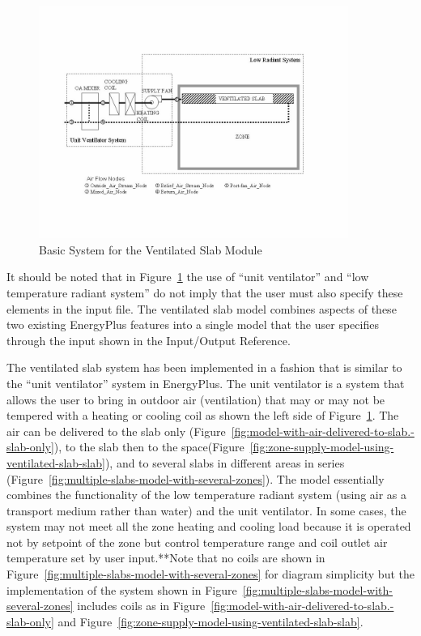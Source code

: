 \begin{figure}[hbtp] %
\centering
\includegraphics[width=0.9\textwidth, height=0.9\textheight, keepaspectratio=true]{media/image7396.png}
\caption{Basic System for the Ventilated Slab Module \protect \label{fig:basic-system-for-the-ventilated-slab-module}}
\end{figure}

It should be noted that in Figure~\ref{fig:basic-system-for-the-ventilated-slab-module} the use of ``unit ventilator'' and ``low temperature radiant system'' do not imply that the user must also specify these elements in the input file. The ventilated slab model combines aspects of these two existing EnergyPlus features into a single model that the user specifies through the input shown in the Input/Output Reference.

The ventilated slab system has been implemented in a fashion that is similar to the ``unit ventilator'' system in EnergyPlus. The unit ventilator is a system that allows the user to bring in outdoor air (ventilation) that may or may not be tempered with a heating or cooling coil as shown the left side of Figure~\ref{fig:basic-system-for-the-ventilated-slab-module}. The air can be delivered to the slab only (Figure~\ref{fig:model-with-air-delivered-to-slab.-slab-only}), to the slab then to the space(Figure~\ref{fig:zone-supply-model-using-ventilated-slab-slab}), and to several slabs in different areas in series (Figure~\ref{fig:multiple-slabs-model-with-several-zones}). The model essentially combines the functionality of the low temperature radiant system (using air as a transport medium rather than water) and the unit ventilator. In some cases, the system may not meet all the zone heating and cooling load because it is operated not by setpoint of the zone but control temperature range and coil outlet air temperature set by user input.**Note that no coils are shown in Figure~\ref{fig:multiple-slabs-model-with-several-zones} for diagram simplicity but the implementation of the system shown in Figure~\ref{fig:multiple-slabs-model-with-several-zones} includes coils as in Figure~\ref{fig:model-with-air-delivered-to-slab.-slab-only} and Figure~\ref{fig:zone-supply-model-using-ventilated-slab-slab}.

